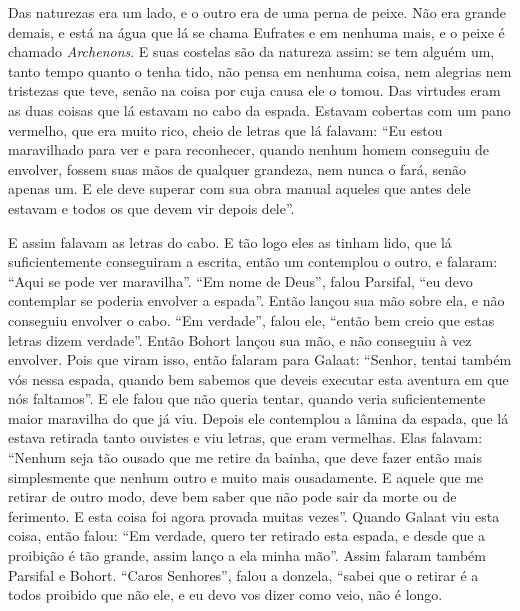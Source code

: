 Das naturezas era um lado, e o outro era de uma perna de peixe. Não era grande
demais, e está na água que lá se chama Eufrates e em nenhuma mais, e o peixe é
chamado \textit{Archenons}. E suas costelas são da natureza assim: se tem
alguém um, tanto tempo quanto o tenha tido, não pensa em nenhuma coisa, nem
alegrias nem tristezas que teve, senão na coisa por cuja causa ele o tomou. Das
virtudes eram as duas coisas que lá estavam no cabo da espada. Estavam cobertas
com um pano vermelho, que era muito rico, cheio de letras que lá falavam: “Eu
estou maravilhado para ver e para reconhecer, quando nenhum homem conseguiu de
envolver, fossem suas mãos de qualquer grandeza, nem nunca o fará, senão apenas
um. E ele deve superar com sua obra manual aqueles que antes dele estavam e
todos os que devem vir depois dele”. 

E assim falavam as letras do cabo. E tão logo eles as tinham lido, que lá
suficientemente conseguiram a escrita, então um contemplou o outro, e falaram:
“Aqui se pode ver maravilha”. “Em nome de Deus”, falou Parsifal, “eu devo
contemplar se poderia envolver a espada”. Então lançou sua mão sobre ela, e não
conseguiu envolver o cabo. “Em verdade”, falou ele, “então bem creio que estas
letras dizem verdade”. Então Bohort lançou sua mão, e não conseguiu à vez
envolver. Pois que viram isso, então falaram para Galaat: “Senhor, tentai
também vós nessa espada, quando bem sabemos que deveis executar esta aventura
em que nós faltamos”. E ele falou que não queria tentar, quando veria
suficientemente maior maravilha do que já viu. Depois ele contemplou a lâmina
da espada, que lá estava retirada tanto ouvistes e viu letras, que eram
vermelhas. Elas falavam: “Nenhum seja tão ousado que me retire da
bainha, que deve fazer então mais simplesmente que nenhum outro e muito mais
ousadamente. E aquele que me retirar de outro modo, deve bem saber que não pode
sair da morte ou de ferimento. E esta coisa foi agora provada muitas vezes”.
Quando Galaat viu esta coisa, então falou: “Em verdade, quero ter retirado esta
espada, e desde que a proibição é tão grande, assim lanço a ela minha mão”.
Assim falaram também Parsifal e Bohort. “Caros Senhores”, falou a
donzela, “sabei que o retirar é a todos proibido que não ele, e eu devo vos
dizer como veio, não é longo.

